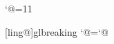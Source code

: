 \edef\ResetAtCatcodeInGlbreak{\noexpand\catcode`@=\the\catcode`@}
\catcode`@=11
\def\glw@begingl@a{%
   \glw@begingl@b
      \@glpreamblefalse
      \rightskip=\ling@glrightskip
      \lineskiplimit=0pt
      \ifling@autoglskip
         \let\glstrut=\strut
         \epd@gllineskip=\baselineskip
         \advance\epd@gllineskip by -\dp\strutbox
         \advance\epd@gllineskip by -\ht\strutbox
         \advance\epd@gllineskip by \lingextraglskip
      \else
         \epd@gllineskip=\linggllineskip
      \fi
      \edef\gl@lineskipsave{\noexpand\lineskip=\the\lineskip}%
      \ifcase\ep@glhangstyle
         \or
            \hangindent=\ling@glhangindent
            \hangafter=1
         \or
            \glwcascade@makeshape
            \parshape 9
            \glwcascade@parshapetarget
         \fi
      \let\mainlist=\empty
      \let\aboveskiplist=\empty
      \let\strutlist=\empty
      \let\everylist=\empty
}
\def\glw@begingl@b@vtop{%
   \vtop\bgroup
      \ifdim\ling@glwidth=0pt
            \advance\hsize by -\leftskip
            \advance\hsize by -\rightskip
         \else
            \hsize=\ling@glwidth
         \fi
 }
\def\glw@begingl@b@breaking{\bgroup}

[ling@]{glbreaking}{%
   \ifling@glbreaking
      \let\glw@begingl@b=\bgroup
   \else
      \let\glw@begingl@b=\glw@begingl@b@vtop
   \fi}
\ResetAtCatcodeInGlbreak

